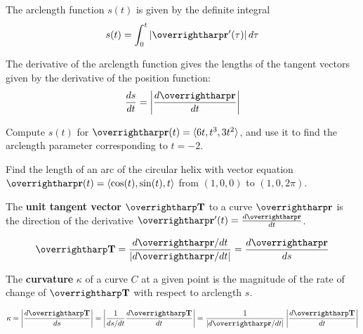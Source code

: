 \documentclass[letterpaper, twoside, 12pt]{book}
\begin{document}
\begin{theorem}
The arclength function $s(t)$ is given by the definite integral
\[
  s(t)
    =
  \int_0^t |\vect{r}'(\tau)| \dvar{\tau}
\]
\end{theorem}

\begin{theorem}
The derivative of the arclength function gives the lengths of
the tangent vectors given by the derivative of the position function:
\[
  \frac{ds}{dt} = \left|\frac{d\vect{r}}{dt}\right|
\]
\end{theorem}

          \begin{problem}
            Compute $s(t)$ for $\vect{r}(t)=\<6t, t^3, 3t^2\>$,
            and use it to find the arclength parameter corresponding
            to $t=-2$.
          \end{problem}

          \begin{solution}

          \end{solution}

          \begin{problem}
            Find the length of an arc of the circular helix with
            vector equation
            $\vect{r}(t) = \<\cos(t),\sin(t),t\>$
            from $(1,0,0)$ to $(1,0,2\pi)$.
          \end{problem}

\begin{definition}
  The \textbf{unit tangent vector} $\vect{T}$ to a curve $\vect{r}$ is the
  direction of the derivative $\vect{r}'(t)=\frac{d\vect{r}}{dt}$.
\end{definition}

\begin{theorem}
  \[
    \vect{T} = \frac{d\vect{r}/dt}{|d\vect{r}/dt|} = \frac{d\vect{r}}{ds}
  \]
\end{theorem}

\begin{definition}
  The \textbf{curvature} $\kappa$ of a curve $C$ at a given point is
  the magnitude of the rate of change of $\vect{T}$ with respect to
  arclength $s$.
\end{definition}

\begin{theorem}
  \[
    \kappa
      =
    \left|
    \frac{d\vect{T}}{ds}
    \right|
      =
    \left|
    \frac{1}{ds/dt}
    \frac{d\vect{T}}{dt}
    \right|
      =
    \frac{1}{|d\vect{r}/dt|}
    \left|
      \frac{d\vect{T}}{dt}
    \right|
  \]
\end{theorem}
\end{document}
